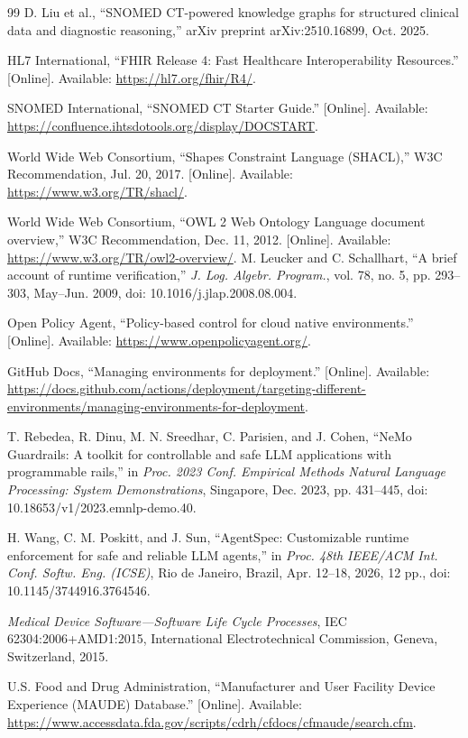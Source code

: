 \documentclass[journal,twoside,web]{ieeecolor}
\begin{document}
\begin{thebibliography}{99}
D. Liu et al.,
``SNOMED CT-powered knowledge graphs for structured clinical data and diagnostic reasoning,''
arXiv preprint arXiv:2510.16899, Oct. 2025.

HL7 International,
``FHIR Release 4: Fast Healthcare Interoperability Resources.''
[Online]. Available: \url{https://hl7.org/fhir/R4/}.

SNOMED International,
``SNOMED CT Starter Guide.''
[Online]. Available: \url{https://confluence.ihtsdotools.org/display/DOCSTART}.

World Wide Web Consortium,
``Shapes Constraint Language (SHACL),'' W3C Recommendation, Jul. 20, 2017.
[Online]. Available: \url{https://www.w3.org/TR/shacl/}.

World Wide Web Consortium,
``OWL 2 Web Ontology Language document overview,'' W3C Recommendation, Dec. 11, 2012.
[Online]. Available: \url{https://www.w3.org/TR/owl2-overview/}.  
M. Leucker and C. Schallhart,
``A brief account of runtime verification,''
\textit{J. Log. Algebr. Program.}, vol. 78, no. 5, pp. 293--303, May--Jun. 2009,
doi: 10.1016/j.jlap.2008.08.004.

Open Policy Agent,
``Policy-based control for cloud native environments.''
[Online]. Available: \url{https://www.openpolicyagent.org/}.

GitHub Docs,
``Managing environments for deployment.''
[Online]. Available: \url{https://docs.github.com/actions/deployment/targeting-different-environments/managing-environments-for-deployment}.



T. Rebedea, R. Dinu, M. N. Sreedhar, C. Parisien, and J. Cohen,
``NeMo Guardrails: A toolkit for controllable and safe LLM applications with programmable rails,''
in \textit{Proc. 2023 Conf. Empirical Methods Natural Language Processing: System Demonstrations},
Singapore, Dec. 2023, pp. 431--445, doi: 10.18653/v1/2023.emnlp-demo.40.

H. Wang, C. M. Poskitt, and J. Sun,
``AgentSpec: Customizable runtime enforcement for safe and reliable LLM agents,''
in \textit{Proc. 48th IEEE/ACM Int. Conf. Softw. Eng. (ICSE)},
Rio de Janeiro, Brazil, Apr. 12--18, 2026, 12 pp.,
doi: 10.1145/3744916.3764546.

\textit{Medical Device Software---Software Life Cycle Processes},
IEC 62304:2006+AMD1:2015, International Electrotechnical Commission,
Geneva, Switzerland, 2015.

U.S. Food and Drug Administration,
``Manufacturer and User Facility Device Experience (MAUDE) Database.''
[Online]. Available: \url{https://www.accessdata.fda.gov/scripts/cdrh/cfdocs/cfmaude/search.cfm}.

\fussy
\end{thebibliography}
\end{document}
